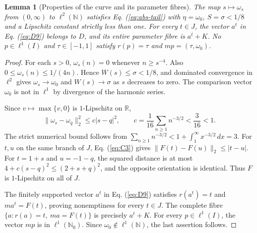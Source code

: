 \documentclass[11pt]{article}
\newcommand{\R}{\mathbb R}
\newcommand{\N}{\mathbb N}
\newcommand{\Nzero}{\mathbb N_0}
\newtheorem{lemma}{Lemma}
\theoremstyle{definition}
\theoremstyle{remark}
\begin{document}
\begin{lemma}[Properties of the curve and its parameter fibres]
\label{lem:coordinate-profile}
The map $s\mapsto\omega_s$ from $(0,\infty)$ to $\ell^2(\N)$ satisfies Eq. (\ref{eq:abs-tail}) with $\eta=\omega_0$, $S=\sigma<1/8$ and a Lipschitz constant strictly less than one. For every $t\in J$, the vector $a^t$ in Eq. (\ref{eq:D9}) belongs to $D$, and its entire parameter fibre is $a^t+K$. No $p\in\ell^1(I)$ and $\tau\in[-1,1]$ satisfy $r(p)=\tau$ and $mp=(\tau,\omega_0)$.
\end{lemma}
\begin{proof}
\label{sec:C2}
For each $s>0$, $\omega_s(n)=0$ whenever $n\ge s^{-4}$. Also $0\le\omega_s(n)\le1/(4n)$. Hence $W(s)\le\sigma<1/8$, and dominated convergence in $\ell^2$ gives $\omega_s\to\omega_0$ and $W(s)\to\sigma$ as $s$ decreases to zero. The comparison vector $\omega_0$ is not in $\ell^1$ by divergence of the harmonic series.

Since $v\mapsto\max\{v,0\}$ is $1$-Lipschitz on $\R$,
\begin{equation}
\|\omega_s-\omega_q\|_2^2\le c|s-q|^2,\qquad
c=\frac1{16}\sum_{n\ge1}n^{-3/2}<\frac3{16}<1.
\label{eq:C3}
\end{equation}
The strict numerical bound follows from $\sum_{n\ge1}n^{-3/2}<1+\int_1^\infty x^{-3/2}\,dx=3$. For $t,u$ on the same branch of $J$, Eq. (\ref{eq:C3}) gives $\|F(t)-F(u)\|_2\le|t-u|$. For $t=1+s$ and $u=-1-q$, the squared distance is at most $4+c(s-q)^2\le(2+s+q)^2$, and the opposite orientation is identical. Thus $F$ is $1$-Lipschitz on all of $J$.

The finitely supported vector $a^t$ in Eq. (\ref{eq:D9}) satisfies $r(a^t)=t$ and $ma^t=F(t)$, proving nonemptiness for every $t\in J$. The complete fibre $\{a:r(a)=t,\ ma=F(t)\}$ is precisely $a^t+K$. For every $p\in\ell^1(I)$, the vector $mp$ is in $\ell^1(\Nzero)$. Since $\omega_0\notin\ell^1(\N)$, the last assertion follows.
\end{proof}
\end{document}
